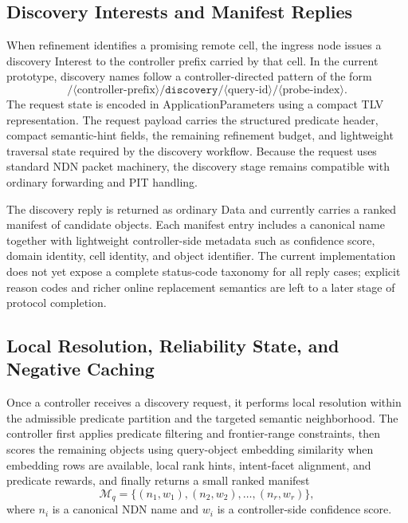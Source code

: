 \documentclass[journal]{IEEEtran}
\newcommand{\ap}{ApplicationParameters}
\begin{document}
\subsection{Discovery Interests and Manifest Replies}

When refinement identifies a promising remote cell, the ingress node issues a discovery Interest to the controller prefix carried by that cell. In the current prototype, discovery names follow a controller-directed pattern of the form
\begin{equation}
/\langle \text{controller-prefix} \rangle/\texttt{discovery}/\langle \text{query-id} \rangle/\langle \text{probe-index} \rangle.
\end{equation}
The request state is encoded in \ap{} using a compact TLV representation. The request payload carries the structured predicate header, compact semantic-hint fields, the remaining refinement budget, and lightweight traversal state required by the discovery workflow. Because the request uses standard NDN packet machinery, the discovery stage remains compatible with ordinary forwarding and PIT handling.

The discovery reply is returned as ordinary Data and currently carries a ranked manifest of candidate objects. Each manifest entry includes a canonical name together with lightweight controller-side metadata such as confidence score, domain identity, cell identity, and object identifier. The current implementation does not yet expose a complete status-code taxonomy for all reply cases; explicit reason codes and richer online replacement semantics are left to a later stage of protocol completion.

\subsection{Local Resolution, Reliability State, and Negative Caching}

Once a controller receives a discovery request, it performs local resolution within the admissible predicate partition and the targeted semantic neighborhood. The controller first applies predicate filtering and frontier-range constraints, then scores the remaining objects using query-object embedding similarity when embedding rows are available, local rank hints, intent-facet alignment, and predicate rewards, and finally returns a small ranked manifest
\begin{equation}
\mathcal{M}_q=\{(n_1,w_1),(n_2,w_2),\ldots,(n_r,w_r)\},
\end{equation}
where $n_i$ is a canonical NDN name and $w_i$ is a controller-side confidence score.
\end{document}
